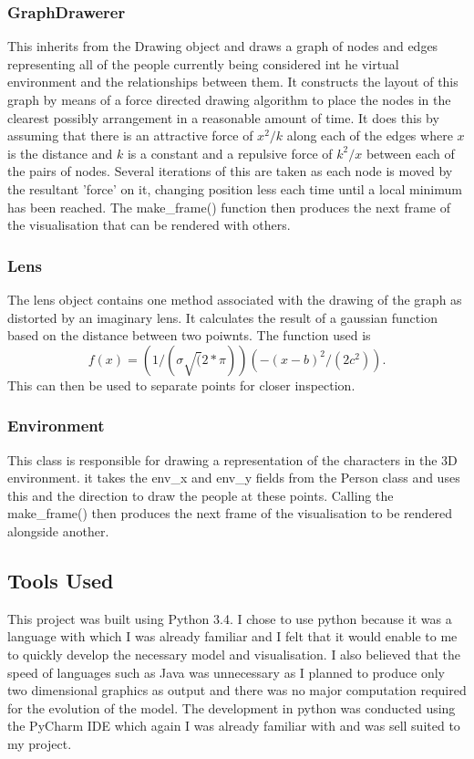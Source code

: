 \documentclass[12pt,a4paper]{article}
\begin{document}
\subsubsection{GraphDrawerer}
This inherits from the Drawing object and draws a graph of nodes and edges representing all of the people currently being considered int he virtual environment and the relationships between them. It constructs the layout of this graph by means of a force directed drawing algorithm to place the nodes in the clearest possibly arrangement in a reasonable amount of time. It does this by assuming that there is an attractive force of $x^2/k$ along each of the edges where $x$ is the distance and $k$ is a constant and a repulsive force of $k^2/x$ between each of the pairs of nodes. Several iterations of this are taken as each node is moved by the resultant 'force' on it, changing position less each time until a local minimum has been reached. The make\_frame() function then produces the next frame of the visualisation that can be rendered with others.

\subsubsection{Lens}
The lens object contains one method associated with the drawing of the graph as distorted by an imaginary lens. It calculates the result of a gaussian function based on the distance between two poiwnts. The function used is
\begin{equation}
f(x)=(1/(\sigma\sqrt(2*\pi))(-(x-b)^2/(2c^2)).
\end{equation}
This can then be used to separate points for closer inspection.

\subsubsection{Environment}
This class is responsible for drawing a representation of the characters in the 3D environment. it takes the env\_x and env\_y fields from the Person class and uses this and the direction to draw the people at these points. Calling the make\_frame() then produces the next frame of the visualisation to be rendered alongside another.

\subsection{Tools Used}
This project was built using Python 3.4. I chose to use python because it was a language with which I was already familiar and I felt that it would enable to me to quickly develop the necessary model and visualisation. I also believed that the speed of languages such as Java was unnecessary as I planned to produce only two dimensional graphics as output and there was no major computation required for the evolution of the model. The development in python was conducted using the PyCharm IDE which again I was already familiar with and was sell suited to my project.
\end{document}
